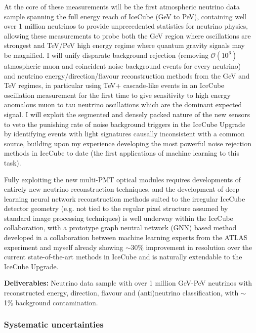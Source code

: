 \documentclass[a4paper,11pt]{article}
\begin{document}
At the core of these measurements will be the first atmospheric neutrino data sample spanning the full energy reach of IceCube (GeV to PeV), containing well over 1 million neutrinos to provide unprecedented statistics for neutrino physics, allowing these measurements to probe both the GeV region where oscillations are strongest and TeV/PeV high energy regime where quantum gravity signals may be magnified. I will unify disparate background rejection (removing $\mathcal{O}(10^6)$ atmospheric muon and coincident noise background events for every neutrino) and neutrino energy/direction/flavour reconstruction methods from the GeV and TeV regimes, in particular using TeV+ cascade-like events in an IceCube oscillation measurement for the first time to give sensitivity to high energy anomalous muon to tau neutrino oscillations which are the dominant expected signal. I will exploit the segmented and densely packed nature of the new sensors to veto the punishing rate of noise background triggers in the IceCube Upgrade by identifying events with light signatures causally inconsistent with a common source, building upon my experience developing the most powerful noise rejection methods in IceCube to date (the first applications of machine learning to this task).

Fully exploiting the new multi-PMT optical modules requires developments of entirely new neutrino reconstruction techniques, and the development of deep learning neural network reconstruction methods suited to the irregular IceCube detector geometry (e.g. not tied to the regular pixel structure assumed by standard image processing techniques) is well underway within the IceCube collaboration, with a prototype graph neutral network (GNN) based method developed in a  collaboration between machine learning experts from the ATLAS experiment and myself already showing $\sim$30\% improvement in resolution over the current state-of-the-art methods in IceCube and is naturally extendable to the IceCube Upgrade. 

\textbf{Deliverables:} Neutrino data sample with over 1 million GeV-PeV neutrinos with reconstructed energy, direction, flavour and (anti)neutrino classification, with $\sim$1\% background contamination. \\

\subsubsection{Systematic uncertainties}

\end{document}
